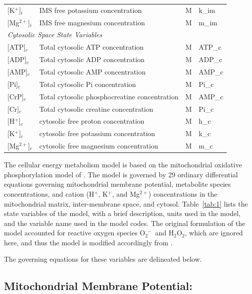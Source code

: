\documentclass[fleqn,10pt]{physiome}
\begin{document}
\begin{table}[ht]
\begin{tabular}{l l l l}
{[K$^+$]}$_i$     & IMS free potassium concentration & M  & k\_im \\
{[Mg$^{2+}$]}$_i$ & IMS free magnesium concentration & M  & m\_im \\
\multicolumn{4}{l}{\em Cytosolic Space State Variables} \\
{[ATP]}$_c$       & Total cytosolic ATP concentration      & M  & ATP\_c \\
{[ADP]}$_c$       & Total cytosolic ADP concentration      & M  & ADP\_c \\
{[AMP]}$_c$       & Total cytosolic AMP concentration      & M  & AMP\_c \\
{[Pi]}$_c$        & Total cytosolic Pi concentration       & M  & Pi\_c \\
{[CrP]}$_c$       & Total cytosolic phosphocreatine concentration & M  & AMP\_c \\
{[Cr]}$_c$        & Total cytosolic creatine concentration        & M  & Pi\_c \\
{[H$^+$]}$_c$     & cytosolic free proton concentration    & M  & h\_c \\
{[K$^+$]}$_c$     & cytosolic free potassium concentration & M  & k\_c \\
{[Mg$^{2+}$]}$_c$ & cytosolic free magnesium concentration & M  & m\_c \\
\bottomrule
\end{tabular}
\end{table}

The cellular energy metabolism model is based on the mitochondrial oxidative phosphorylation model of \cite{Bazil2016}. The model is governed by 29 ordinary differential equations governing mitochondrial membrane potential, metabolite species concentrations, and cation (H$^+$, K$^+$, and Mg$^{2+}$) concentrations in the mitochondrial matrix, inter-membrane space, and cytosol. Table~\ref{tab:1} lists the state variables of the model, with a brief description, units used in the model, and the variable name used in the model codes. The original formulation of the model accounted for reactive oxygen species O$_2^{\cdot -}$ and H$_2$O$_2$, which are ignored here, and thus the model is modified accordingly from \cite{Bazil2016}.

The governing equations for these variables are delineated below.

\subsection{Mitochondrial Membrane Potential:}
\end{document}
